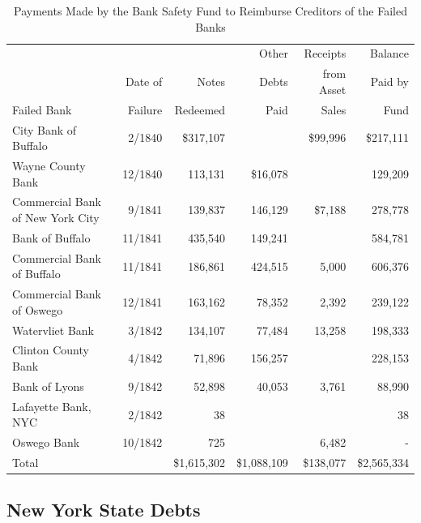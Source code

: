 \documentclass[11pt]{article}
\newcommand{\STRUT}{\rule{0in}{3ex}}
\begin{document}
\begin{table}[htbp]
\centering\small
\begin{tabular}{lrrrrr}
                               &          &           & Other     & Receipts    & Balance \\
                               & Date of  & Notes     & Debts     & from Asset  & Paid by \\
Failed Bank                    & Failure  & Redeemed  & Paid      & Sales       & Fund \\
\hline
City Bank of Buffalo           & 2/1840   & \$317,107 &           & \$99,996    & \$217,111\STRUT \\
Wayne County Bank              & 12/1840  &   113,131 & \$16,078  &             &    129,209 \\
Commercial Bank of New York City& 9/1841  &   139,837 &   146,129 & \$7,188     &    278,778 \\
Bank of Buffalo                & 11/1841  &   435,540 &   149,241 &             &    584,781 \\
Commercial Bank of Buffalo     & 11/1841  &   186,861 &   424,515 &   5,000     &    606,376 \\
Commercial Bank of Oswego      & 12/1841  &   163,162 &    78,352 &   2,392     &    239,122 \\
Watervliet Bank                & 3/1842   &   134,107 &    77,484 &  13,258     &    198,333 \\
Clinton County Bank            & 4/1842   &    71,896 &   156,257 &             &    228,153 \\
Bank of Lyons                  & 9/1842   &    52,898 &    40,053 &   3,761     &     88,990 \\
Lafayette Bank, NYC            & 2/1842   &        38 &           &             &         38 \\
Oswego Bank                    & 10/1842  &       725 &           &   6,482     &          - \\
\hline
Total                          &          & \$1,615,302 & \$1,088,109 & \$138,077 & \$2,565,334\STRUT \\
\end{tabular}
\caption{Payments Made by the Bank Safety Fund to Reimburse Creditors of the Failed Banks}
\label{table:failed_banks}
\end{table}

\subsection{New York State Debts}
\label{sec:ny_debt}
\end{document}
